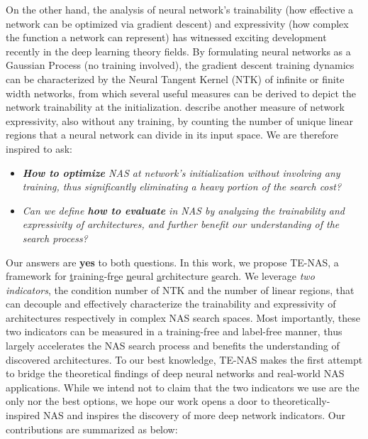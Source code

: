 \documentclass{article} \usepackage{iclr2021_conference,times}
\begin{document}
On the other hand, the analysis of neural network's trainability (how effective a network can be optimized via gradient descent) and expressivity (how complex the function a network can represent) has witnessed exciting development recently in the deep learning theory fields.
By formulating neural networks as a Gaussian Process (no training involved), the gradient descent training dynamics can be characterized by the Neural Tangent Kernel (NTK) of infinite \citep{lee2019wide} or finite \citep{yang2019scaling} width networks, from which several useful measures can be derived to depict the network trainability at the initialization.   \citet{hanin2019complexity,hanin2019deep,xiong2020number} describe another measure of network expressivity, also without any training, by counting the number of unique linear regions that a neural network can divide in its input space. 
We are therefore inspired to ask:
\vspace{-0.5em}
\begin{itemize}[leftmargin=*]
    \item \emph{\textbf{How to optimize} NAS at network's initialization without involving any training, thus significantly eliminating a heavy portion of the search cost?}
    \item \emph{Can we define \textbf{how to evaluate} in NAS by analyzing the trainability and expressivity of architectures, and further benefit our understanding of the search process?}
\end{itemize}
\vspace{-0.5em}
Our answers are \textbf{yes} to both questions.
In this work, we propose TE-NAS, a framework for \underline{t}raining-fr\underline{e}e \underline{n}eural \underline{a}rchitecture \underline{s}earch. We leverage \textit{two indicators}, the condition number of NTK and the number of linear regions, that can decouple and effectively characterize the trainability and expressivity of architectures respectively in complex NAS search spaces. Most importantly, these two indicators can be measured in a training-free and label-free manner, thus largely accelerates the NAS search process and benefits the understanding of discovered architectures. To our best knowledge, TE-NAS makes the first attempt to bridge the theoretical findings of deep neural networks and real-world NAS applications. While we intend not to claim that the two indicators we use are the only nor the best options, we hope our work opens a door to theoretically-inspired NAS and inspires the discovery of more deep network indicators.
Our contributions are summarized as below:
\end{document}
